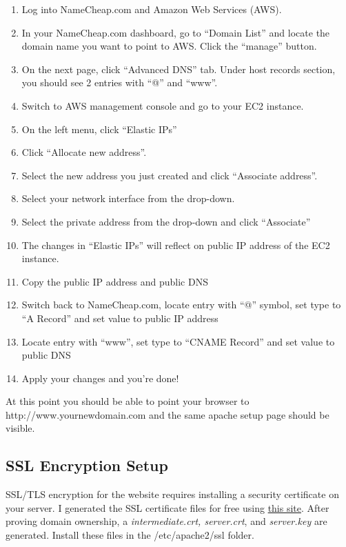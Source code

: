 \documentclass[a4paper]{article}
\begin{document}
\begin{enumerate}
\item     Log into NameCheap.com and Amazon Web Services (AWS).
\item     In your NameCheap.com dashboard, go to “Domain List” and locate the domain name you want to point to AWS. Click the “manage” button.
\item     On the next page, click “Advanced DNS” tab. Under host records section, you should see 2 entries with “@” and “www”.
\item     Switch to AWS management console and go to your EC2 instance.
\item     On the left menu, click “Elastic IPs”
\item     Click “Allocate new address”.
\item     Select the new address you just created and click “Associate address”.
\item     Select your network interface from the drop-down.
\item     Select the private address from the drop-down and click “Associate”
\item     The changes in “Elastic IPs” will reflect on public IP address of the EC2 instance.
\item     Copy the public IP address and public DNS
\item     Switch back to NameCheap.com, locate entry with “@” symbol, set type to “A Record” and set value to public IP address
\item     Locate entry with “www”, set type to “CNAME Record” and set value to public DNS
\item     Apply your changes and you’re done!
\end{enumerate}

At this point you should be able to point your browser to http://www.yournewdomain.com and the same apache setup page should be visible.

\subsection{SSL Encryption Setup}

SSL/TLS encryption for the website requires installing a security certificate on your server. I generated the SSL certificate files for free using \href{https://www.sslforfree.com}{this site}. After proving domain ownership, a \textit{intermediate.crt, server.crt}, and \textit{server.key} are generated. Install these files in the /etc/apache2/ssl folder. 
\end{document}
